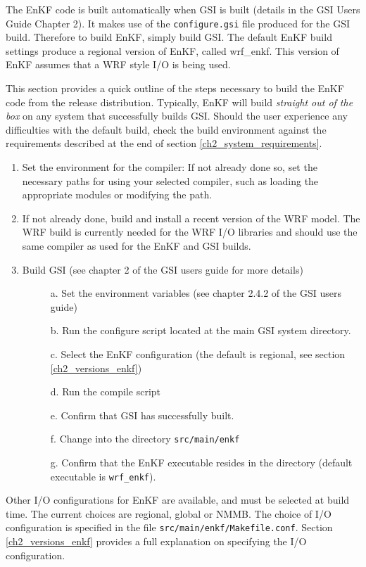 The EnKF code is built automatically when GSI is built (details in the GSI User\textquotesingle s Guide Chapter 2). It makes use of the \verb|configure.gsi| file produced 
for the GSI build. Therefore to build EnKF, simply build GSI.  The default EnKF build settings produce a regional 
version of EnKF, called wrf\_enkf. This version of EnKF assumes that a WRF style I/O is being used. 

This section provides a quick outline of the steps necessary to build the EnKF code from the release distribution.
Typically, EnKF will build \textit{straight out of the box} on any system that successfully builds GSI. Should the user experience any difficulties with the default build, check the build environment against the requirements described at the end of section \ref{ch2_system_requirements}.
\begin{enumerate}
\item Set the environment for the compiler: If not already done so, set the necessary paths for using your selected compiler, such as loading the appropriate modules or modifying the path.
\item If not already done, build and install a recent version of the WRF model. The WRF build is currently needed for the WRF I/O libraries and should use the same compiler as used for the EnKF and GSI builds.
\item Build GSI (see chapter 2 of the GSI users guide for more details)
\begin{description}
\item[ ]a. Set the environment variables (see chapter 2.4.2 of the GSI users guide)
\item[ ]b. Run the configure script located at the main GSI system directory.
\item[ ]c. Select the EnKF configuration (the default is regional, see section \ref{ch2_versions_enkf})
\item[ ]d. Run the compile script
\item[ ]e. Confirm that GSI has successfully built.
\item[ ]f. Change into the directory \verb|src/main/enkf|
\item[ ]g. Confirm that the EnKF executable resides in the directory  (default executable is \verb|wrf_enkf|).
\end{description}
\end{enumerate}

Other I/O configurations for EnKF are available, and must be selected at build time. The current choices are regional, global or NMMB. The choice of I/O configuration is specified in the file \verb|src/main/enkf/Makefile.conf|. Section \ref{ch2_versions_enkf} provides a full explanation on specifying the I/O configuration.

